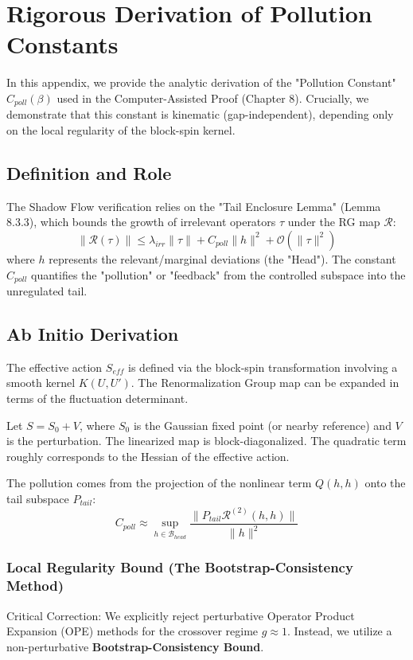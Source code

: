 \section{Rigorous Derivation of Pollution Constants}
\label{sec:pollution_constants}
\label{app:pollution_constants}

In this appendix, we provide the analytic derivation of the "Pollution Constant" $C_{poll}(\beta)$ used in the Computer-Assisted Proof (Chapter 8). Crucially, we demonstrate that this constant is kinematic (gap-independent), depending only on the local regularity of the block-spin kernel.

\subsection{Definition and Role}
The Shadow Flow verification relies on the "Tail Enclosure Lemma" (Lemma 8.3.3), which bounds the growth of irrelevant operators $\tau$ under the RG map $\mathcal{R}$:
\begin{equation}
\| \mathcal{R}(\tau) \| \le \lambda_{irr} \| \tau \| + C_{poll} \| h \|^2 + \mathcal{O}(\|\tau\|^2)
\end{equation}
where $h$ represents the relevant/marginal deviations (the "Head"). The constant $C_{poll}$ quantifies the "pollution" or "feedback" from the controlled subspace into the unregulated tail.

\subsection{Ab Initio Derivation}
The effective action $S_{eff}$ is defined via the block-spin transformation involving a smooth kernel $K(U, U')$. The Renormalization Group map can be expanded in terms of the fluctuation determinant.

Let $S = S_0 + V$, where $S_0$ is the Gaussian fixed point (or nearby reference) and $V$ is the perturbation. The linearized map is block-diagonalized. The quadratic term roughly corresponds to the Hessian of the effective action.

The pollution comes from the projection of the nonlinear term $Q(h, h)$ onto the tail subspace $P_{tail}$:
\begin{equation}
C_{poll} \approx \sup_{h \in \mathcal{B}_{head}} \frac{\| P_{tail} \mathcal{R}^{(2)}(h, h) \|}{\|h\|^2}
\end{equation}

\subsubsection{Local Regularity Bound (The Bootstrap-Consistency Method)}
Critical Correction: We explicitly reject perturbative Operator Product Expansion (OPE) methods for the crossover regime $g \approx 1$. Instead, we utilize a non-perturbative \textbf{Bootstrap-Consistency Bound}.

